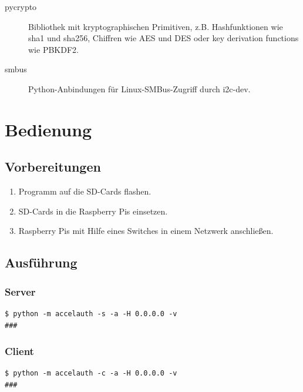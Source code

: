 \documentclass{article}
\begin{document}
\begin{description}
	\item[pycrypto] Bibliothek mit kryptographischen Primitiven, z.B. Hashfunktionen wie sha1 und sha256, Chiffren wie AES und DES oder key derivation functions wie PBKDF2.
	\item[smbus] Python-Anbindungen für Linux-SMBus-Zugriff durch i2c-dev.
\end{description}

\newpage
\section{Bedienung}
\subsection{Vorbereitungen}
\begin{enumerate}
	\item Programm auf die SD-Cards flashen.
	\item SD-Cards in die Raspberry Pis einsetzen.
	\item Raspberry Pis mit Hilfe eines Switches in einem Netzwerk anschließen.
\end{enumerate}

\subsection{Ausführung}
\subsubsection*{Server}
\begin{lstlisting}
$ python -m accelauth -s -a -H 0.0.0.0 -v
###
\end{lstlisting}

\subsubsection*{Client}
\begin{lstlisting}
$ python -m accelauth -c -a -H 0.0.0.0 -v
###
\end{lstlisting}
\end{document}
